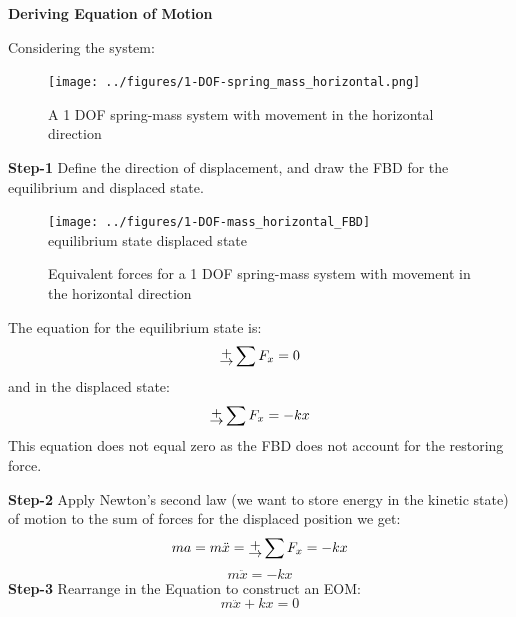\documentclass[12pt,letter]{article}
\begin{document}
					
		\begin{example}			
			

			\textbf{Deriving Equation of Motion}

			\noindent Considering the system:
			\begin{figure}[H]
				\centering
				\texttt{[image: ../figures/1-DOF-spring\_mass\_horizontal.png]}
				\caption{A 1 DOF spring-mass system with movement in the horizontal direction}
			\end{figure}		
			
			\noindent \textbf{Step-1}
			Define the direction of displacement, and draw the FBD for the equilibrium and displaced state.  
			\begin{figure}[H]
				\centering
				\texttt{[image: ../figures/1-DOF-mass\_horizontal\_FBD]}\\
				equilibrium state \hspace{3cm} displaced state
				\caption{Equivalent forces for a 1 DOF spring-mass system with movement in the horizontal direction}
			\end{figure}		
			\noindent The equation for the equilibrium state is:
			\begin{equation}
			\rightplus \sum F_x = 0
			\end{equation}
			and in the displaced state:
			\begin{equation}
			\rightplus \sum F_x = -kx
			\end{equation}		
			This equation does not equal zero as the FBD does not account for the restoring force. 
	
			\noindent	\textbf{Step-2} Apply Newton's second law (we want to store energy in the kinetic state) of motion to the sum of forces for the displaced position we get: 		 		
			\begin{equation}
			ma = m\ddot{x} = \rightplus \sum F_x = -kx
			\end{equation}			
			\begin{equation}
			m\ddot{x} = -kx
			\end{equation}				
			\textbf{Step-3} Rearrange in the Equation to construct an EOM: 			
			\begin{equation}
			m\ddot{x} + kx = 0
			\end{equation}		
		\end{example}			
\end{document}
